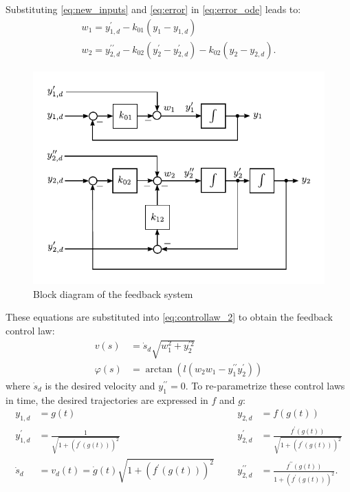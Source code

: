 \documentclass[a4paper,12pt,headinclude=true,headsepline,parskip=half,DIV=12]{scrartcl}
\begin{document}
Substituting \autoref{eq:new_inputs} and \autoref{eq:error} in \autoref{eq:error_ode} leads to:
\begin{subequations}
  \begin{align}
    w_1 =  y_{1,d}^\prime - k_{01}(y_{1}-y_{1,d}) \\
    w_2 = y_{2,d}^{\prime\prime}  - k_{02}(y_{2}^\prime-y_{2,d}^\prime) - k_{02}(y_{2}-y_{2,d}).
  \end{align}
\end{subequations}
\begin{figure}[ht]
  \centering
  \includegraphics[scale=1]{img/linear_system_feedback.pdf}
  \caption{Block diagram of the feedback system}
  \label{fig:linear_system_feedback}
\end{figure}
These equations are substituted into \autoref{eq:controllaw_2} to obtain the feedback control law:
\begin{subequations}
  \begin{align}
    v(s)       & = \dot{s}_d\sqrt{w_1^2+y_2^{\prime 2}}\\
    \varphi(s) & = \arctan\left(l (w_2w_1-y_1^{\prime\prime}y_2^\prime)\right)
  \end{align}
\end{subequations}
where $\dot{s}_d$ is the desired velocity  and $y_1^{\prime\prime} = 0$.
To re-parametrize these control laws in time, the desired trajectories are expressed in $f$ and $g$:
\begin{subequations}
  \begin{align*}
    y_{1,d}        & = g(t)  &  &  & y_{2,d}             & = f(g(t))                                                  \\
    y_{1,d}^\prime & = \frac{1}{\sqrt{1+(f^{\prime }(g(t)))^2}} &  &  & y_{2,d}^\prime        & = \frac{f^{\prime }(g(t))}{\sqrt{1+(f^{\prime }(g(t)))^2}} \\
    \dot{s}_d      & = v_d(t) = \dot g(t) \sqrt{1 + (f^\prime(g(t)))^2} &  &  & y_{2,d}^{\prime\prime} & = \frac{f^{\prime \prime}(g(t))}{1+(f^{\prime }(g(t)))^2}.
  \end{align*}
\end{subequations}
\end{document}
